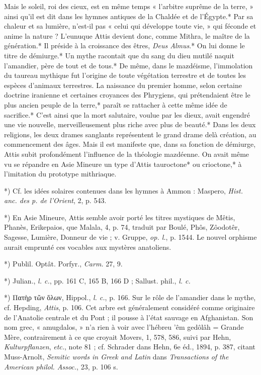 \documentclass[a4paper, 11pt, oneside, polutonikogreek, french]{article}
\begin{document}
Mais le soleil, roi des cieux, est en même temps « l'arbitre suprême de la terre, » ainsi qu'il est dit dans les hymnes antiques de la Chaldée et de l'Égypte.* Par sa chaleur et sa lumière, n'est-il pas « celui qui développe toute vie, » qui féconde et anime la nature ? L'eunuque Attis devient donc, comme Mithra, le maître de la génération.* Il préside à la croissance des êtres, \emph{Deus Almus}.* On lui donne le titre de démiurge.* Un mythe racontait que du sang du dieu mutilé naquit l'amandier, père de tout et de tous.* De même, dans le mazdéisme, l'immolation du taureau mythique fut l'origine de toute végétation terrestre et de toutes les espèces d'animaux terrestres. La naissance du premier homme, selon certaine doctrine iranienne et certaines croyances des Phrygiens, qui prétendaient être le plus ancien peuple de la terre,* paraît se rattacher à cette même idée de sacrifice.* C'est ainsi que la mort salutaire, voulue par les dieux, avait engendré une vie nouvelle, merveilleusement plus riche avec plus de beauté.* Dans les deux religions, les deux drames sanglants représentent le grand drame delà création, au commencement des âges. Mais il est manifeste que, dans sa fonction de démiurge, Attis subit profondément l'influence de la théologie mazdéenne. On avait même vu se répandre en Asie Mineure un type d'Attis tauroctone* ou crioctone,* à l'imitation du prototype mithriaque.

*) Cf. les idées solaires contenues dans les hymnes à Ammon : Maspero, \emph{Hist. anc. des p. de l'Orient}, 2, p. 543.

*) En Asie Mineure, Attis semble avoir porté les titres mystiques de Mêtis, Phanès, Erikepaios, que Malala, 4, p. 74, traduit par Boulé, Phôs, Zôodotêr, Sagesse, Lumière, Donneur de vie ; v. Gruppe, \emph{op. l.}, p. 1544. Le nouvel orphisme aurait emprunté ces vocables aux mystères anatoliens.

*) Publil. Optât. Porfyr., \emph{Carm.} 27, 9.

*) Julian., \emph{l. c.}, pp. 161 C, 165 B, 166 D ; Sallust. phil., \emph{l. c.}

*) Πατὴρ τῶν ὅλων, Hippol., \emph{l. c.}, p. 166. Sur le rôle de l'amandier dans le mythe, cf. Hepding, \emph{Attis}, p. 106. Cet arbre est généralement considéré comme originaire de l'Anatolie centrale et du Pont ; il pousse à l'état sauvage en Afghanistan. Son nom grec, « amugdalos, » n'a rien à voir avec l'hébreu 'êm gedôlâh = Grande Mère, contrairement à ce que croyait Movers, 1, 578, 586, suivi par Hehn, \emph{Kulturpflanzen}, \emph{etc.}, note 81 ; cf. Schrader dans Hehn, 6e éd., 1894, p. 387, citant Muss-Arnolt, \emph{Semitic words in Greek and Latin} dans \emph{Transactions of the American philol. Assoc.}, 23, p. 106 s.
\end{document}
